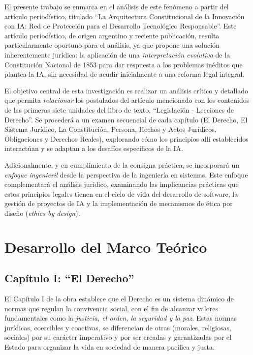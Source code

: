 \documentclass[11pt, a4paper]{article}
\begin{document}
El presente trabajo se enmarca en el análisis de este fenómeno a partir del artículo periodístico, titulado \enquote{La Arquitectura Constitucional de la Innovación con IA: Red de Protección para el Desarrollo Tecnológico Responsable}. Este artículo periodístico, de origen argentino y reciente publicación, resulta particularmente oportuno para el análisis, ya que propone una solución inherentemente jurídica: la aplicación de una \emph{interpretación evolutiva} de la Constitución Nacional de 1853 para dar respuesta a los problemas inéditos que plantea la IA, sin necesidad de acudir inicialmente a una reforma legal integral.

El objetivo central de esta investigación es realizar un análisis crítico y detallado que permita \emph{relacionar} los postulados del artículo mencionado con los contenidos de las primeras siete unidades del libro de texto, \enquote{Legislación - Lecciones de Derecho}. Se procederá a un examen secuencial de cada capítulo (El Derecho, El Sistema Jurídico, La Constitución, Persona, Hechos y Actos Jurídicos, Obligaciones y Derechos Reales), explorando cómo los principios allí establecidos interactúan y se adaptan a los desafíos específicos de la IA.

Adicionalmente, y en cumplimiento de la consigna práctica, se incorporará un \emph{enfoque ingenieril} desde la perspectiva de la ingeniería en sistemas. Este enfoque complementará el análisis jurídico, examinando las implicancias prácticas que estos principios legales tienen en el ciclo de vida del desarrollo de software, la gestión de proyectos de IA y la implementación de mecanismos de ética por diseño (\emph{ethics by design}).

\section{Desarrollo del Marco Teórico}
\label{sec:desarrollo}

\subsection{Capítulo I: ``El Derecho''}
\label{subsec:derecho}

El Capítulo I de la obra \textcite{libro_legislacion} establece que el Derecho es un sistema dinámico de normas que regulan la convivencia social, con el fin de alcanzar valores fundamentales como la \emph{justicia, el orden, la seguridad y la paz}. Estas normas jurídicas, coercibles y coactivas, se diferencian de otras (morales, religiosas, sociales) por su carácter imperativo y por ser creadas y garantizadas por el Estado para organizar la vida en sociedad de manera pacífica y justa.
\end{document}
